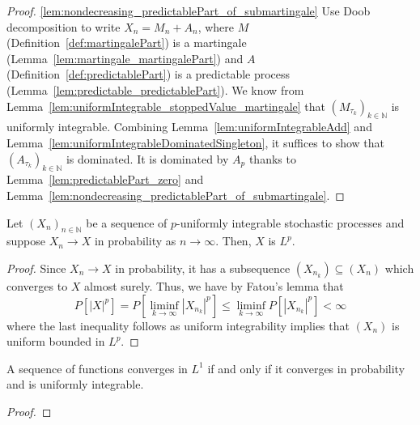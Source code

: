 \begin{proof}
  \ref{lem:nondecreasing_predictablePart_of_submartingale}
Use Doob decomposition to write $X_n = M_n + A_n$, where $M$ (Definition~\ref{def:martingalePart}) is a martingale (Lemma~\ref{lem:martingale_martingalePart}) and $A$ (Definition~\ref{def:predictablePart}) is a predictable process (Lemma~\ref{lem:predictable_predictablePart}).
We know from Lemma~\ref{lem:uniformIntegrable_stoppedValue_martingale} that $(M_{\tau_k})_{k \in \mathbb{N}}$ is uniformly integrable. Combining Lemma~\ref{lem:uniformIntegrableAdd} and Lemma~\ref{lem:uniformIntegrableDominatedSingleton}, it suffices to show that $(A_{\tau_k})_{k \in \mathbb{N}}$ is dominated. It is dominated by $A_p$ thanks to Lemma~\ref{lem:predictablePart_zero} and Lemma~\ref{lem:nondecreasing_predictablePart_of_submartingale}.
\end{proof}

\begin{lemma}\label{lem:memLp_of_tendstoInMeasure}
  \leanok
  Let $(X_n)_{n \in \mathbb{N}}$ be a sequence of $p$-uniformly integrable stochastic processes and suppose $X_n \to X$
  in probability as $n \to \infty$. Then, $X$ is $L^p$.
\end{lemma}

\begin{proof}
  Since $X_n \to X$ in probability, it has a subsequence $(X_{n_k}) \subseteq (X_n)$ which converges
  to $X$ almost surely. Thus, we have by Fatou's lemma that
  \[P[|X|^p] = P[\liminf_{k \to \infty} |X_{n_k}|^p] \le \liminf_{k \to \infty} P[|X_{n_k}|^p] < \infty\]
  where the last inequality follows as uniform integrability implies that $(X_n)$ is uniform bounded in $L^p$.
\end{proof}

\begin{lemma}\label{lem:vitali}
  \mathlibok
  A sequence of functions converges in $L^1$ if and only if it converges in probability and is uniformly integrable.
\end{lemma}

\begin{proof}\leanok

\end{proof}

